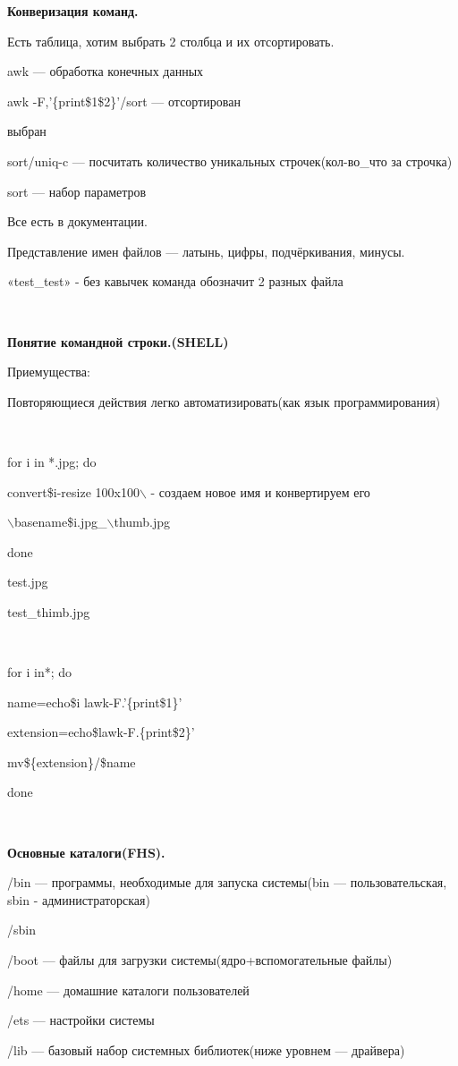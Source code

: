 \par \textbf{Конверизация
команд.}
\par Есть
таблица, хотим выбрать 2 столбца и их
отсортировать.
\par  awk —
обработка конечных данных
\par  awk
-F,'\{print\$1\$2\}'/sort — отсортирован
\par             
  выбран
\par  sort/uniq-c
— посчитать количество уникальных
строчек(кол-во\_что за строчка)
\par  sort —
набор параметров
\par Все есть
в документации.
\par Представление
имен файлов — латынь, цифры, подчёркивания,
минусы.
\par «test\_test»
- без кавычек команда обозначит 2 разных
файла
\par \\

\par \textbf{Понятие
командной строки.(SHELL)}
\par 
Приемущества:
\par 
Повторяющиеся действия легко
автоматизировать(как язык программирования)
\par 
\\

\par  for
i in *.jpg; do
\par 
	convert\$i-resize 100x100$\backslash$          - создаем новое имя
и конвертируем его
\par 
	$\backslash$basename\$i.jpg\_$\backslash$thumb.jpg
\par  done
\par  test.jpg
\par 
test\_thimb.jpg
\par \\

\par  for i in*;
do
\par 	name=echo\$i
lawk-F.'\{print\$1\}'
\par 	extension=echo\$lawk-F.\{print\$2\}'
\par 	mv\$\{extension\}/\$name
\par  done
\par \\

\par \textbf{Основные
каталоги(FHS).}
\par /bin
— программы, необходимые для запуска
системы(bin — пользовательская, sbin - 
	администраторская)
\par 
/sbin
\par 
/boot — файлы для загрузки
системы(ядро+вспомогательные файлы)
\par 
/home — домашние каталоги пользователей
\par 
/ets — настройки системы
\par 
/lib — базовый набор системных библиотек(ниже
уровнем — драйвера) 

